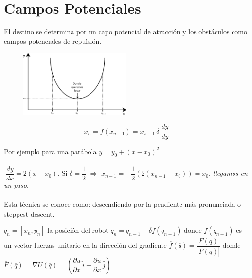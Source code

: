 \section{Campos Potenciales}

El destino se determina por un capo potencial de atracción y los obstáculos como campos potenciales de repulsión.

\begin{figure}[h!]
	\centering
	\includegraphics[width=0.5\textwidth]{images/img13.png}
	\label{figura13}
\end{figure}


$$x_{n} = f(x_{n - 1}) = x_{x - 1} \, \delta \; \dfrac{dy}{dy}$$

Por ejemplo para una parábola \hspace{1cm} $y = y_{0} + (x - x_{0})^2$ 
\paragraph{}
$\;\dfrac{dy}{dx} = 2(x - x_{0})$. \hspace{1cm} Si $\delta = \dfrac{1}{2}$ $\Rightarrow$ $x_{n - 1} = -\dfrac{1}{2} (2(x_{n - 1} - x_{0})) = x_{0}$, \textit{llegamos en un paso}.

\paragraph{}
Esta técnica se conoce como: descendiendo por la pendiente más pronunciada o steppest descent.

$\overline{q}_{n} = [x_n,y_n]$ \hspace{0.5cm} la posición del robot \hspace{0.5cm}  $\overline{q}_{n} = \overline{q}_{n - 1} - \delta \overline{f} \left( \overline{q}_{n - 1} \right)$ \hfill \break
donde $\overline{f} \left( \overline{q}_{n - 1}\right)$ es un vector fuerzas unitario en la dirección del gradiente $\overline{f}(\overline{q}) = \dfrac{\overline{F(\overline{q})}}{\left| \overline{F}(\overline{q})\right|}$ 
\hfill \break
donde $\overline{F}(\overline{q}) = \nabla U(\overline{q}) = \left( \dfrac{\partial u}{\partial x} \,\hat{i} + \dfrac{\partial u}{\partial x}\, \hat{j} \right)$ 

